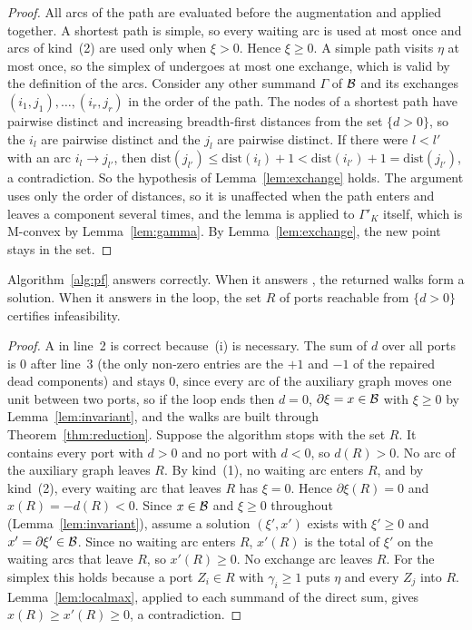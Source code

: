 \begin{proof}
All arcs of the path are evaluated before the augmentation and applied together. A shortest path is simple, so every waiting arc is used at most once and arcs of kind~(2) are used only when $\xi>0$. Hence $\xi\ge0$. A simple path visits $\eta$ at most once, so the simplex of \FREE{} undergoes at most one exchange, which is valid by the definition of the arcs. Consider any other summand $\Gamma$ of $\mathcal{B}$ and its exchanges $(i_1,j_1),\dots,(i_r,j_r)$ in the order of the path. The nodes of a shortest path have pairwise distinct and increasing breadth-first distances from the set $\{d>0\}$, so the $i_l$ are pairwise distinct and the $j_l$ are pairwise distinct. If there were $l<l'$ with an arc $i_l\to j_{l'}$, then $\mathrm{dist}(j_{l'})\le\mathrm{dist}(i_l)+1<\mathrm{dist}(i_{l'})+1=\mathrm{dist}(j_{l'})$, a contradiction. So the hypothesis of Lemma~\ref{lem:exchange} holds. The argument uses only the order of distances, so it is unaffected when the path enters and leaves a component several times, and the lemma is applied to $\Gamma'_K$ itself, which is M-convex by Lemma~\ref{lem:gamma}. By Lemma~\ref{lem:exchange}, the new point stays in the set.
\end{proof}

\begin{theorem}\label{thm:correct}
Algorithm~\ref{alg:pf} answers correctly. When it answers \YES{}, the returned walks form a solution. When it answers \NO{} in the loop, the set $R$ of ports reachable from $\{d>0\}$ certifies infeasibility.
\end{theorem}

\begin{proof}
A \NO{} in line~2 is correct because~(i) is necessary. The sum of $d$ over all ports is $0$ after line~3 (the only non-zero entries are the $+1$ and $-1$ of the repaired dead components) and stays $0$, since every arc of the auxiliary graph moves one unit between two ports, so if the loop ends then $d=0$, $\partial\xi=x\in\mathcal{B}$ with $\xi\ge0$ by Lemma~\ref{lem:invariant}, and the walks are built through Theorem~\ref{thm:reduction}. Suppose the algorithm stops with the set $R$. It contains every port with $d>0$ and no port with $d<0$, so $d(R)>0$. No arc of the auxiliary graph leaves $R$. By kind~(1), no waiting arc enters $R$, and by kind~(2), every waiting arc that leaves $R$ has $\xi=0$. Hence $\partial\xi(R)=0$ and $x(R)=-d(R)<0$. Since $x\in\mathcal{B}$ and $\xi\ge0$ throughout (Lemma~\ref{lem:invariant}), assume a solution $(\xi',x')$ exists with $\xi'\ge0$ and $x'=\partial\xi'\in\mathcal{B}$. Since no waiting arc enters $R$, $x'(R)$ is the total of $\xi'$ on the waiting arcs that leave $R$, so $x'(R)\ge0$. No exchange arc leaves $R$. For the simplex this holds because a port $Z_i\in R$ with $\gamma_i\ge1$ puts $\eta$ and every $Z_j$ into $R$. Lemma~\ref{lem:localmax}, applied to each summand of the direct sum, gives $x(R)\ge x'(R)\ge0$, a contradiction.
\end{proof}

